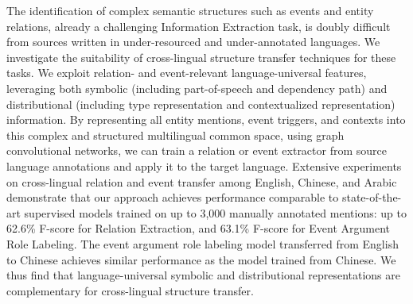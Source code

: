 The identification of complex semantic structures such as events and entity relations, already a challenging Information Extraction task, is doubly difficult from sources written in under-resourced and under-annotated languages. We investigate the suitability of cross-lingual structure transfer techniques for these tasks. We exploit relation- and event-relevant language-universal features, leveraging both symbolic (including part-of-speech and dependency path) and distributional (including type representation and contextualized representation) information. By representing all entity mentions, event triggers, and contexts into this complex and structured multilingual common space, using graph convolutional networks, we can train a relation or event extractor from source language annotations and apply it to the target language. Extensive experiments on cross-lingual relation and event transfer among English, Chinese, and Arabic demonstrate that our approach achieves performance comparable to state-of-the-art supervised models trained on up to 3,000 manually annotated mentions: up to 62.6\% F-score for Relation Extraction, and 63.1\% F-score for Event Argument Role Labeling. The event argument role labeling model transferred from English to Chinese achieves similar performance as the model trained from Chinese. We thus find that language-universal symbolic and distributional representations are complementary for cross-lingual structure transfer.